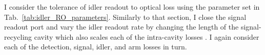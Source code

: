 

I consider the tolerance of idler readout to optical loss using the parameter set in Tab.~\ref{tab:idler_RO_parameters}. Similarly to that section, I close the signal readout port and vary the idler readout rate by changing the length of the signal-recycling cavity which also scales each of the intra-cavity losses . I again consider each of the detection, signal, idler, and arm losses in turn.


